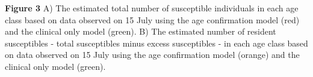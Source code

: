 \textbf{Figure 3} A) The estimated total number of susceptible
individuals in each age class based on data observed on 15 July using
the age confirmation model (red) and the clinical only model (green).
B) The estimated number of resident susceptibles - total susceptibles
minus excess susceptibles - in each age class based on data observed on
15 July using the age confirmation model (orange) and the clinical only
model (green).